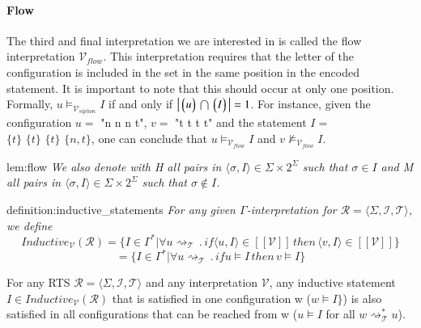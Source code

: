 \paragraph*{Flow}
The third and final interpretation we are interested in is called the flow interpretation $\mathcal{V}_{flow}$.
This interpretation requires that the letter of the configuration is included in the set in the same position in the encoded statement. 
It is important to note that this should occur at only one position.
Formally, $u \models_{\mathcal{V}_{siphon}} I$ if and only if  $\left|\left\lgroup u \right\rgroup \bigcap \left\lgroup I \right\rgroup\right| = 1$.
For instance, given the configuration $u = $ "n n n t", $v = $ "t t t t" and the statement $I =$ $\{t\} \,\, \{t\} \,\, \{t\} \,\, \{n, t\}$,
one can conclude that $u \models_{\mathcal{V}_{flow}} I$ and $v \not\models_{\mathcal{V}_{flow}} I$.
\begin{lem}{lem:flow}
    \textit{We also denote with H all pairs in $\langle \sigma, I \rangle \in \Sigma \times 2^{\Sigma}$
    such that  $\sigma \in I$ and M all pairs in $\langle \sigma, I \rangle \in \Sigma \times 2^{\Sigma}$
    such that  $\sigma \notin I$.}

\end{lem}
\begin{theo}{definition:inductive_statements}
    \textit{
        For any given $\Gamma$-\textit{interpretation} for $\mathcal{R} = \langle \Sigma, \mathcal{I}, \mathcal{T} \rangle$, we define
        \[
        Inductive_{\mathcal{V}}(\mathcal{R}) = \lbrace I \in \Gamma^* | 
        \forall u \rightsquigarrow_\mathcal{T} \, . \, if \langle u, I \rangle
        \in [[\mathcal{V}]] \, then \, \langle v, I \rangle \in [[\mathcal{V}]] \rbrace
        \]
        \[=  \lbrace I \in \Gamma^* | 
        \forall u \rightsquigarrow_\mathcal{T} \, . \, if u \models I
            \, then \, v \models I \rbrace\]
    }
\end{theo}
For any RTS $\mathcal{R} = \langle \Sigma, \mathcal{I}, \mathcal{T} \rangle$
and any interpretation $\mathcal{V}$, any inductive
statement $I \in Inductive_{\mathcal{V}}(\mathcal{R})$
that is satisfied in one configuration w ($w \models I \rbrace$) is also satisfied
in all configurations that can be reached from w ($u \models I$ for all $w \rightsquigarrow_\mathcal{T}^{*} u$).

